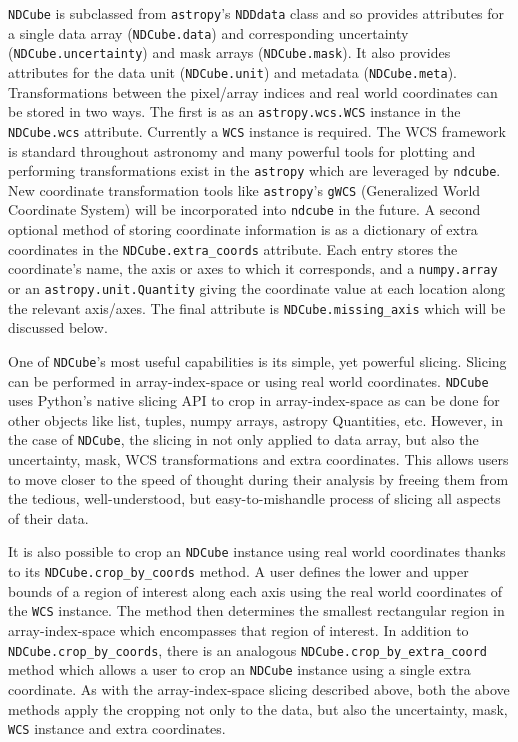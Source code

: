 \texttt{NDCube} is subclassed from \texttt{astropy}'s \texttt{NDDdata} class and so provides attributes for a single data array (\texttt{NDCube.data}) and corresponding uncertainty (\texttt{NDCube.uncertainty}) and mask arrays (\texttt{NDCube.mask}).
It also provides attributes for the data unit (\texttt{NDCube.unit}) and metadata (\texttt{NDCube.meta}).
Transformations between the pixel/array indices and real world coordinates can be stored in two ways.
The first is as an \texttt{astropy.wcs.WCS} instance in the \texttt{NDCube.wcs} attribute.
Currently a \texttt{WCS} instance is required.
The WCS framework is standard throughout astronomy and many powerful tools for plotting and performing transformations exist in the \texttt{astropy} which are leveraged by \texttt{ndcube}.
New coordinate transformation tools like \texttt{astropy}'s \texttt{gWCS} (Generalized World Coordinate System) will be incorporated into \texttt{ndcube} in the future.
A second optional method of storing coordinate information is as a dictionary of extra coordinates in the \texttt{NDCube.extra\_coords} attribute.
Each entry stores the coordinate's name, the axis or axes to which it corresponds, and a \texttt{numpy.array} or an \texttt{astropy.unit.Quantity} giving the coordinate value at each location along the relevant axis/axes.
The final attribute is \texttt{NDCube.missing\_axis} which will be discussed below.

One of \texttt{NDCube}'s most useful capabilities is its simple, yet powerful slicing.
Slicing can be performed in array-index-space or using real world coordinates.
\texttt{NDCube} uses Python's native slicing API to crop in array-index-space as can be done for other objects like list, tuples, numpy arrays, astropy Quantities, etc.
However, in the case of \texttt{NDCube}, the slicing in not only applied to data array, but also the uncertainty, mask, WCS transformations and extra coordinates.
This allows users to move closer to the speed of thought during their analysis by freeing them from the tedious, well-understood, but easy-to-mishandle process of slicing all aspects of their data.

It is also possible to crop an \texttt{NDCube} instance using real world coordinates thanks to its \texttt{NDCube.crop\_by\_coords} method.
A user defines the lower and upper bounds of a region of interest along each axis using the real world coordinates of the \texttt{WCS} instance.
The method then determines the smallest rectangular region in array-index-space which encompasses that region of interest.
In addition to \texttt{NDCube.crop\_by\_coords}, there is an analogous \texttt{NDCube.crop\_by\_extra\_coord} method which allows a user to crop an \texttt{NDCube} instance using a single extra coordinate.
As with the array-index-space slicing described above, both the above methods apply the cropping not only to the data, but also the uncertainty, mask, \texttt{WCS} instance and extra coordinates.

